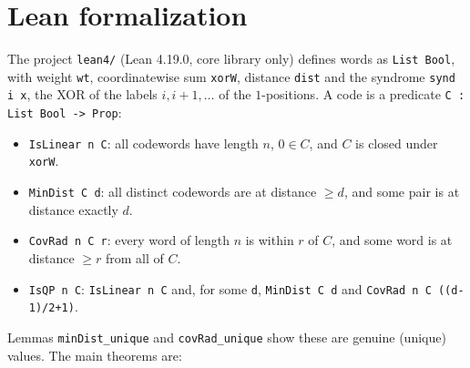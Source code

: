 \documentclass[11pt]{article}
\theoremstyle{definition}
\theoremstyle{remark}
\begin{document}
\section{Lean formalization}
The project \texttt{lean4/} (Lean 4.19.0, core library only) defines words as
\texttt{List Bool}, with weight \texttt{wt}, coordinatewise sum \texttt{xorW},
distance \texttt{dist} and the syndrome \texttt{synd i x}, the XOR of the labels
$i,i+1,\dots$ of the $1$-positions. A code is a predicate
\texttt{C : List Bool -> Prop}:
\begin{itemize}
\item \texttt{IsLinear n C}: all codewords have length $n$, $0\in C$, and $C$
is closed under \texttt{xorW}.
\item \texttt{MinDist C d}: all distinct codewords are at distance $\ge d$, and
some pair is at distance exactly $d$.
\item \texttt{CovRad n C r}: every word of length $n$ is within $r$ of $C$, and
some word is at distance $\ge r$ from all of $C$.
\item \texttt{IsQP n C}: \texttt{IsLinear n C} and, for some \texttt{d}, \texttt{MinDist C d} and \texttt{CovRad n C ((d-1)/2+1)}.
\end{itemize}
Lemmas \texttt{minDist\_unique} and \texttt{covRad\_unique} show these are
genuine (unique) values. The main theorems are:
\end{document}
